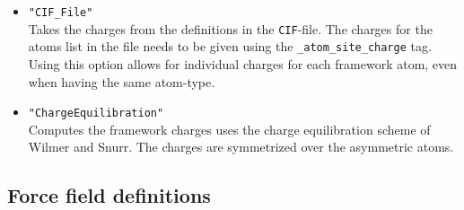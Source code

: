\begin{itemize}
\begin{itemize}
  \item{\verb+"CIF_File"+}\\
  Takes the charges from the definitions in the \texttt{CIF}-file.
  The charges for the atoms list in the file needs to be given using the \verb+_atom_site_charge+ tag.
  Using this option allows for individual charges for each framework atom, even when having the same atom-type.
  \item{\verb+"ChargeEquilibration"+}\\
   Computes the framework charges uses the charge equilibration scheme of Wilmer and Snurr.
   The charges are symmetrized over the asymmetric atoms.
  \end{itemize}
\end{itemize}

\subsection{Force field definitions}

